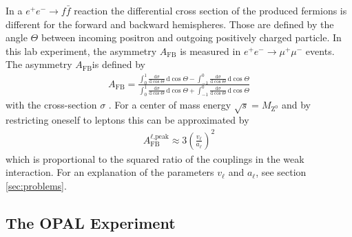 \documentclass[11pt, a4paper]{article}
\numberwithin{equation}{section}
\newcommand\dinf[1]{ \,\mathrm{d}#1 }
\newcommand\deriv[2] { \frac{\mathrm{d} #1}{\mathrm{d} #2} }
\begin{document}
In a $e^+e^- \rightarrow f\bar{f}$ reaction the differential cross section of the produced fermions is different for the forward and backward hemispheres.
Those are defined by the angle $\Theta$ between incoming positron and outgoing positively charged particle.
In this lab experiment, the asymmetry $A_\mathrm{FB}$ is measured in $e^+e^- \rightarrow \mu^+\mu^-$ events. 
The asymmetry $A_\mathrm{FB}$is defined by
\begin{align}
	A_\mathrm{FB}=\frac{\int_{0}^{1}{\deriv{\sigma}{\cos\Theta}}\dinf{\cos\Theta}-\int_{-1}^{0}{\deriv{\sigma}{\cos\Theta}}\dinf{\cos\Theta}}{\int_{0}^{1}{\deriv{\sigma}{\cos\Theta}}\dinf{\cos\Theta}+\int_{-1}^{0}{\deriv{\sigma}{\cos\Theta}}\dinf{\cos\Theta}}
	\label{eq:afb}
\end{align}
with the cross-section $\sigma$ \cite{instructions}.
For a center of mass energy $\sqrt{s}=M_\mathrm{Z^0}$ and by restricting oneself to leptons this can be approximated by \cite{instructions}
\begin{align*}
	A_\mathrm{FB}^{\ell\text{,peak}}\approx 3\left(\frac{v_\ell}{a_\ell}\right)^2
\end{align*}
which is proportional to the squared ratio of the couplings in the weak interaction.
For an explanation of the parameters $v_\ell$ and $a_\ell$, see section \ref{sec:problems}.

\subsection{The OPAL Experiment}
\end{document}
